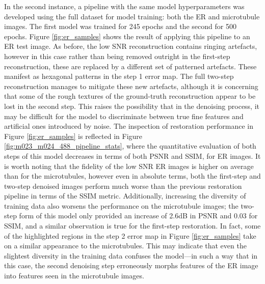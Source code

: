 \documentclass[12pt]{article}
\begin{document}
In the second instance, a pipeline with the same model hyperparameters was developed using the full dataset for model training:
both the ER and microtubule images.
The first model was trained for 245 epochs and the second for 500 epochs.
Figure \ref{fig:er_samples} shows the result of applying this pipeline to an ER test image.
As before, the low SNR reconstruction contains ringing artefacts,
however in this case rather than being removed outright in the first-step reconstruction,
these are replaced by a different set of patterned artefacts.
These manifest as hexagonal patterns in the step 1 error map.
The full two-step reconstruction manages to mitigate these new artefacts,
although it is concerning that some of the rough textures of the ground-truth reconstruction appear to be lost in the second step.
This raises the possibility that in the denoising process,
it may be difficult for the model to discriminate between true fine features and artificial ones introduced by noise.
The inspection of restoration performance in Figure \ref{fig:er_samples} is reflected in Figure \ref{fig:m023_m024_488_pipeline_stats},
where the quantitative evaluation of both steps of this model decreases in terms of both PSNR and SSIM, for ER images.
It is worth noting that the fidelity of the low SNR ER images is higher on average than for the microtubules,
however even in absolute terms, both the first-step and two-step denoised images perform much worse than the previous restoration pipeline in terms of the SSIM metric.
Additionally, increasing the diversity of training data also worsens the performance on the microtubule images;
the two-step form of this model only provided an increase of 2.6dB in PSNR and 0.03 for SSIM,
and a similar observation is true for the first-step restoration.
In fact, some of the highlighted regions in the step 2 error map in Figure \ref{fig:er_samples} take on a similar appearance to the microtubules.
This may indicate that even the slightest diversity in the training data confuses the model---in
such a way that in this case,
the second denoising step erroneously morphs features of the ER image into features seen in the microtubule images.
\end{document}
